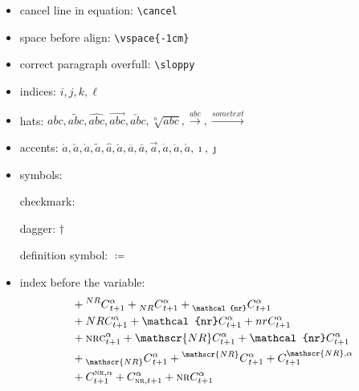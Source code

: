 \documentclass[
	12pt, 
	]{article}
\numberwithin{equation}{section}
\newcommand{\com}[1]{\texttt{\textbackslash #1}}
\theoremstyle{definition}
\theoremstyle{plain}
\theoremstyle{plain}
\theoremstyle{plain}
\begin{document}
\begin{itemize}
	
	\item cancel line in equation: \com{cancel}
	
	
	\item space before align: \com{vspace\{-1cm\}} %
	
	\item correct paragraph overfull: \com{sloppy}
		
	\item indices: $i,j,k,\ell$
	
	\item hats: \( \overline{abc}, \widetilde{abc}, \widehat{abc}, \overrightarrow{abc}, \overleftarrow{abc}, \sqrt[n]{abc}, \xrightarrow{abc}, \xrightarrow{some text}\)
	
	\item accents: \(\acute{a}, \check{a}, \grave{a}, \widetilde{a}, \hat{a}, \breve{a}, \overline{a}, \bar{a}, \vec{a}, \dot{a}, \ddot{a}, \mathring{a}, \imath, \jmath\)
		
	\item symbols:
	
	checkmark: \checkmark 
	
	dagger: $\dagger$
	
	definition symbol: $\coloneq$
	
	\item index before the variable:
	\begin{align*}
		& + \prescript{NR}{}{C}^{\alpha}_{t+1} + \prescript{}{NR}{C}^{\alpha}_{t+1} + \prescript{}{\mathcal{nr}}{C}^{\alpha}_{t+1}        
		\\
		& + NRC^{\alpha}_{t+1} + \mathcal{nr}C^{\alpha}_{t+1} + nrC^{\alpha}_{t+1}
		\\
		& + \textsc{nrc}^{\alpha}_{t+1} + \mathscr{NR}C^{\alpha}_{t+1} + \mathcal{nr}C^{\alpha}_{t+1}
		\\
		& + \prescript{}{\mathscr{NR}}{C}^{\alpha}_{t+1} + \prescript{\mathscr{NR}}{}{C}^{\alpha}_{t+1} + {C}^{\mathscr{NR},\alpha}_{t+1} 
		\\
		& + {C}^{\textsc{nr},\alpha}_{t+1} + {C}^{\alpha}_{\textsc{nr},t+1} + \textsc{nr}C^{\alpha}_{t+1}
	\end{align*}
	

\end{itemize}
\end{document}
